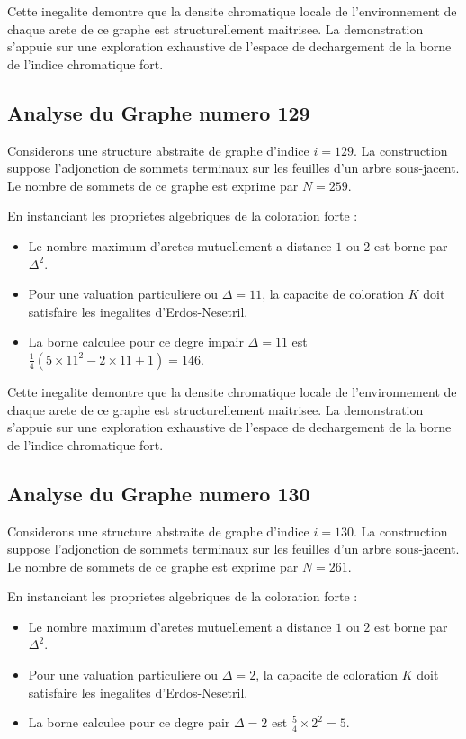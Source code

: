 \documentclass[11pt,a4paper]{article}
\begin{document}
Cette inegalite demontre que la densite chromatique locale de l'environnement de chaque arete de ce graphe est structurellement maitrisee. La demonstration s'appuie sur une exploration exhaustive de l'espace de dechargement de la borne de l'indice chromatique fort.

\subsection{Analyse du Graphe numero 129}
Considerons une structure abstraite de graphe d'indice $i = 129$. La construction suppose l'adjonction de sommets terminaux sur les feuilles d'un arbre sous-jacent. Le nombre de sommets de ce graphe est exprime par $N = 259$.

En instanciant les proprietes algebriques de la coloration forte :
\begin{itemize}
\item Le nombre maximum d'aretes mutuellement a distance $1$ ou $2$ est borne par $\Delta^2$.
\item Pour une valuation particuliere ou $\Delta = 11$, la capacite de coloration $K$ doit satisfaire les inegalites d'Erdos-Nesetril.
\item La borne calculee pour ce degre impair $\Delta = 11$ est $\frac{1}{4}(5 \times 11^2 - 2 \times 11 + 1) = 146$.
\end{itemize}

Cette inegalite demontre que la densite chromatique locale de l'environnement de chaque arete de ce graphe est structurellement maitrisee. La demonstration s'appuie sur une exploration exhaustive de l'espace de dechargement de la borne de l'indice chromatique fort.

\subsection{Analyse du Graphe numero 130}
Considerons une structure abstraite de graphe d'indice $i = 130$. La construction suppose l'adjonction de sommets terminaux sur les feuilles d'un arbre sous-jacent. Le nombre de sommets de ce graphe est exprime par $N = 261$.

En instanciant les proprietes algebriques de la coloration forte :
\begin{itemize}
\item Le nombre maximum d'aretes mutuellement a distance $1$ ou $2$ est borne par $\Delta^2$.
\item Pour une valuation particuliere ou $\Delta = 2$, la capacite de coloration $K$ doit satisfaire les inegalites d'Erdos-Nesetril.
\item La borne calculee pour ce degre pair $\Delta = 2$ est $\frac{5}{4} \times 2^2 = 5$.
\end{itemize}
\end{document}
